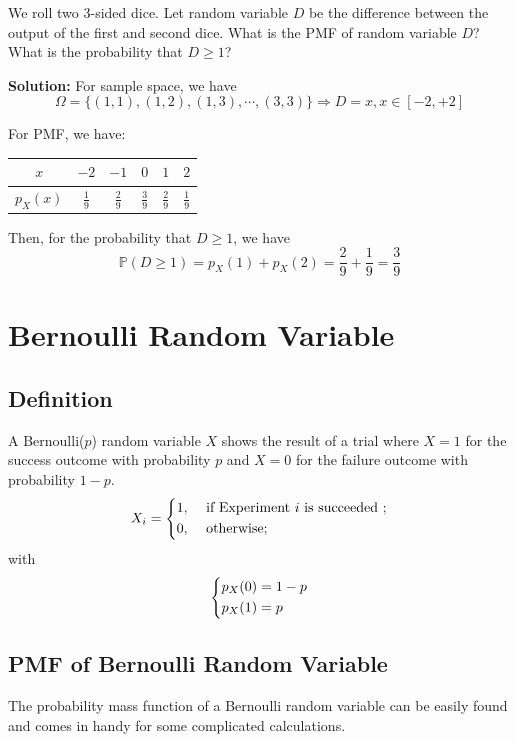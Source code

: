\begin{eg}
We roll two 3-sided dice. Let random variable \(D\) be the difference between the output of the first and second dice. What is the PMF of random variable \(D\)? What is the probability that \(D \geq 1\)?

\textbf{Solution:} 
For sample space, we have
\[
  \Omega = \{(1, 1), (1, 2), (1, 3), \cdots, (3, 3)\} \Longrightarrow D = x, x \in [-2, +2]
\]
\newpage

For PMF, we have:
\begin{table}[H]
  \centering
  \begin{tabular}{c|c|c|c|c|c}
      \(x\)  & \(-2\) & \(-1\) & \(0\) & \(1\) & \(2\)  \\
    \midrule
      \(p_X (x)\)  & \(\frac{1}{9}\) & \(\frac{2}{9}\) & \(\frac{3}{9}\) & \(\frac{2}{9}\) & \(\frac{1}{9}\)
  \end{tabular}
\end{table}

Then, for the probability that \(D \geq 1\), we have 
\[
  \mathbb{P}(D \geq 1) = p_X (1) + p_X (2) = \dfrac{2}{9} + \dfrac{1}{9} = \dfrac{3}{9}
\]
\end{eg}

\section{Bernoulli Random Variable}
\subsection{Definition}
A Bernoulli(\(p\)) random variable \(X\) shows the result of a trial where \(X = 1\) for the success outcome with probability \(p\) and \(X = 0\) for the failure outcome with probability \(1 - p\). 
\[
    X_i = \begin{dcases}
        1, &\text{ if Experiment \(i\) is succeeded }  ;\\
        0, &\text{ otherwise}  ;
    \end{dcases}
\]
with 
\[
  \begin{dcases}
    p_X (0) = 1 - p \\
    p_X (1) = p 
  \end{dcases}
\]

\subsection{PMF of Bernoulli Random Variable}
The probability mass function of a Bernoulli random variable can be easily found and comes in handy for some complicated calculations.  

